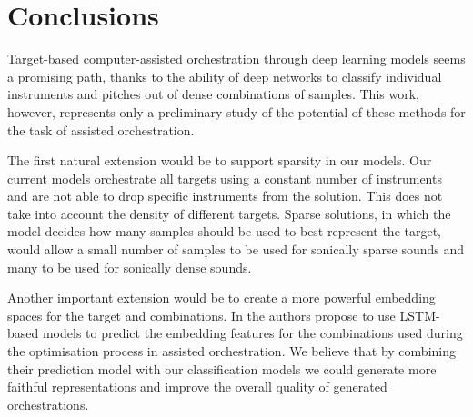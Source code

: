 \documentclass[runningheads,a4paper]{llncs}
\begin{document}
\section{Conclusions}
\label{sec:conclusions}

Target-based computer-assisted orchestration through deep learning models seems a promising path, thanks to the ability of deep networks to classify individual instruments and pitches out of dense combinations of samples. This work, however, represents only a preliminary study of the potential of these methods for the task of assisted orchestration. 

The first natural extension would be to support sparsity in our models. Our current models orchestrate all targets using a constant number of instruments and are not able to drop specific instruments from the solution. This does not take into account the density of different targets. Sparse solutions, in which the model decides how many samples should be used to best represent the target, would allow a small number of samples to be used for sonically sparse sounds and many to be used for sonically dense sounds. %

Another important extension would be to create a more powerful embedding spaces for the target and combinations. In \cite{Gillick19} the authors propose to use LSTM-based models to predict the embedding features for the combinations used during the optimisation process in assisted orchestration. We believe that by combining their prediction model with our classification models we could generate more faithful representations and improve the overall quality of generated orchestrations.
\end{document}
